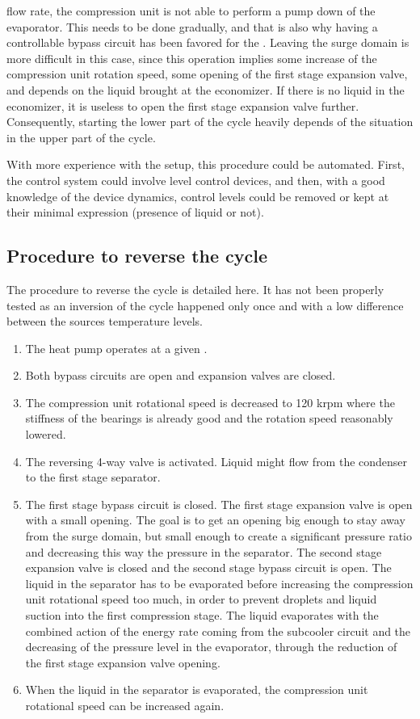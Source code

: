 \begin{enumerate}
  flow rate, the compression unit is not able to perform a pump down
  of the evaporator. This needs to be done gradually, and that is also
  why having a controllable bypass circuit has been favored for the
  \BWP{}. Leaving the surge domain is more difficult in this case,
  since this operation implies some increase of the compression unit
  rotation speed, some opening of the first stage expansion valve, and
  depends on the liquid brought at the economizer. If there is no
  liquid in the economizer, it is useless to open the first stage
  expansion valve further. Consequently, starting the lower part of
  the cycle heavily depends of the situation in the upper part of the
  cycle.
\end{enumerate}

With more experience with the setup, this procedure could be
automated. First, the control system could involve level control
devices, and then, with a good knowledge of the device dynamics,
control levels could be removed or kept at their minimal expression
(presence of liquid or not).

\subsection{Procedure to reverse the cycle}
\label{sec:awp-proc-reversing}

The procedure to reverse the cycle is detailed here. It has not been
properly tested as an inversion of the cycle happened only once and
with a low difference between the sources temperature levels.

\begin{enumerate}
\item The heat pump operates at a given \OP{}.
\item Both bypass circuits are open and expansion valves are closed.
\item The compression unit rotational speed is decreased to 120 krpm
  where the stiffness of the bearings is already good and the rotation
  speed reasonably lowered.
\item The reversing 4-way valve is activated. Liquid might flow from
  the condenser to the first stage separator.
\item The first stage bypass circuit is closed. The first stage
  expansion valve is open with a small opening. The goal is to get an
  opening big enough to stay away from the surge domain, but small
  enough to create a significant pressure ratio and decreasing this
  way the pressure in the separator. The second stage expansion valve
  is closed and the second stage bypass circuit is open. The liquid in
  the separator has to be evaporated before increasing the compression
  unit rotational speed too much, in order to prevent droplets and
  liquid suction into the first compression stage. The liquid
  evaporates with the combined action of the energy rate coming from
  the subcooler circuit and the decreasing of the pressure level in
  the evaporator, through the reduction of the first stage expansion
  valve opening.
\item When the liquid in the separator is evaporated, the compression
  unit rotational speed can be increased again.
\end{enumerate}

